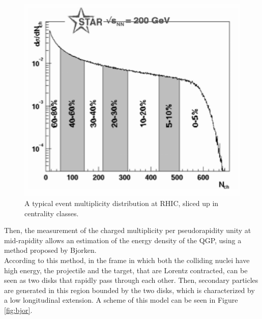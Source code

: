 \begin{figure}
  \centering
  \includegraphics[scale=0.5]{figures/star.png}
  \caption{A typical event multiplicity distribution at RHIC, sliced up in centrality classes.}
  \label{fig:centr}
\end{figure}
%
Then, the measurement of the charged multiplicity per pseudorapidity unity at mid-rapidity allows an estimation of the energy density of the QGP, using a method proposed by Bjorken.\\
According to this method, in the frame in which both the colliding nuclei have high energy, the projectile and the target, that are Lorentz contracted, can be seen as two disks that rapidly pass through each other. Then, secondary particles are generated in this region bounded by the two disks, which is characterized by a low longitudinal extension. A scheme of this model can be seen in Figure \ref{fig:bjor}.\\
%
